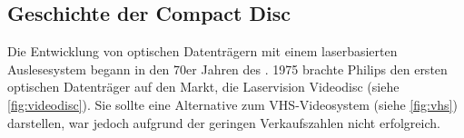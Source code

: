 \subsection{Geschichte der Compact Disc}
\label{subsec:cdgeschichte}

Die Entwicklung von optischen Datenträgern mit einem laserbasierten
Auslesesystem begann in den 70er Jahren des . 1975
brachte Philips den ersten optischen Datenträger auf den Markt, die Laservision
Videodisc (siehe \autoref{fig:videodisc}). Sie sollte eine Alternative zum
VHS-Videosystem (siehe \autoref{fig:vhs}) darstellen, war jedoch aufgrund der
geringen Verkaufszahlen nicht erfolgreich.

